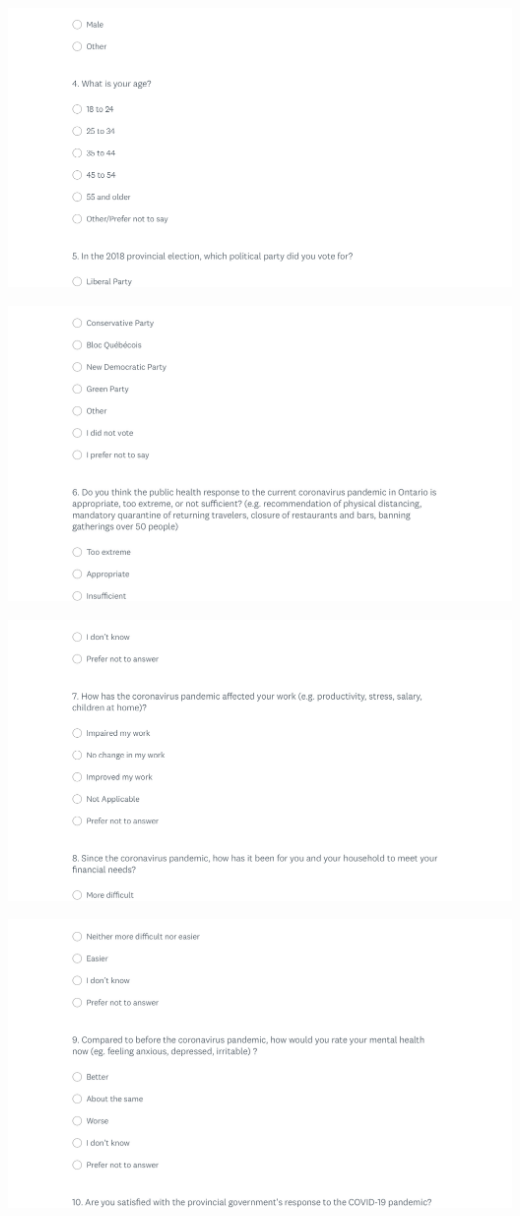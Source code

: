 \documentclass[
]{article}
\begin{document}
\includegraphics{./survey image/1.2.png}

\includegraphics{./survey image/1.3.png}

\includegraphics{./survey image/1.4.png}

\includegraphics{./survey image/1.5.png}
\end{document}
